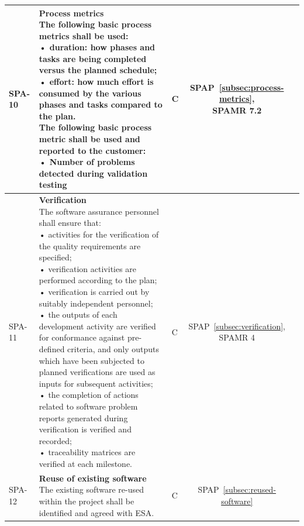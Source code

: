 {\begin{xltabular}{\textwidth}{|l|L|l|S|S|}
        SPA-10 &
        {\textbf{Process metrics} \newline
        The following basic process metrics shall be used: \newline
        • duration: how phases and tasks are being completed versus the planned schedule; \newline
        • effort: how much effort is consumed by the various phases and tasks compared to the plan. \newline
        The following basic process metric shall be used and reported to the customer: \newline
        • Number of problems detected during validation testing} &
        C &
        {SPAP~\ref{subsec:process-metrics}, \newline SPAMR 7.2} &
        \\ \hline

        SPA-11 &
        {\textbf{Verification} \newline
        The software assurance personnel shall ensure that: \newline
        • activities for the verification of the quality requirements are specified; \newline
        • verification activities are performed according to the plan; \newline
        • verification is carried out by suitably independent personnel; \newline
        • the outputs of each development activity are verified for conformance against pre-defined criteria, and only outputs which have been subjected to planned verifications are used as inputs for subsequent activities; \newline
        • the completion of actions related to software problem reports generated during verification is verified and recorded; \newline
        • traceability matrices are verified at each milestone.} &
        C &
        {SPAP~\ref{subsec:verification}, \newline SPAMR 4} &
        \\ \hline

        SPA-12 &
        {\textbf{Reuse of existing software} \newline
        The existing software re-used within the project shall be identified and agreed with ESA.} &
        C &
        {SPAP~\ref{subsec:reused-software}} &
        \\ \hline


\end{xltabular}}
